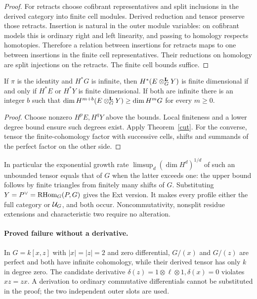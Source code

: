 \documentclass[11pt]{article}
\begin{document}
\begin{proof}
For retracts choose cofibrant representatives and split inclusions in
the derived category into finite cell modules. Derived reduction and
tensor preserve those retracts. Insertion is natural in the outer
module variables: on cofibrant models this is ordinary right and left
linearity, and passing to homology respects homotopies. Therefore a
relation between insertions for retracts maps to one between insertions
in the finite cell representatives. Their reductions on homology are
split injections on the retracts. The finite cell bounds suffice.
\end{proof}

\begin{cor}\label{rigid}
If $\pi$ is the identity and $H^*G$ is infinite, then
$H^*(E\otimes^{\mathbf L}_G Y)$ is finite dimensional if and only if $H^*E$ or $H^*Y$
is finite dimensional. If both are infinite there is an integer $b$ such
that $\dim H^{m+b}(E\otimes^{\mathbf L}_G Y)\ge\dim H^mG$ for every $m\ge0$.
\end{cor}
\begin{proof}
Choose nonzero $H^p E,H^qY$ above the bounds. Local finiteness and a
lower degree bound ensure such degrees exist. Apply Theorem~\ref{cut}.
For the converse, tensor the finite-cohomology factor with successive
cells, shifts and summands of the perfect factor on the other side.
\end{proof}

In particular the exponential growth rate $\limsup_d(\dim H^d)^{1/d}$
of such an unbounded tensor equals that of $G$ when the latter exceeds
one: the upper bound follows by finite triangles from finitely many
shifts of $G$. Substituting $Y=P^\vee=\operatorname{RHom}_G(P,G)$ gives the Ext version.
It makes every profile either the full category or $\mathcal U_G$, and both
occur. Noncommutativity, nonsplit residue extensions and characteristic
two require no alteration.

\paragraph{Proved failure without a derivative.}
In $G=k[x,z]$ with $|x|=|z|=2$ and zero differential, $G/(x)$ and
$G/(z)$ are perfect and both have infinite cohomology, while their
derived tensor has only $k$ in degree zero. The candidate derivative
$\delta(z)=1\otimes\ell\otimes1,\delta(x)=0$ violates $xz=zx$.
A derivation to ordinary commutative differentials cannot be substituted
in the proof; the two independent outer slots are used.
\end{document}
